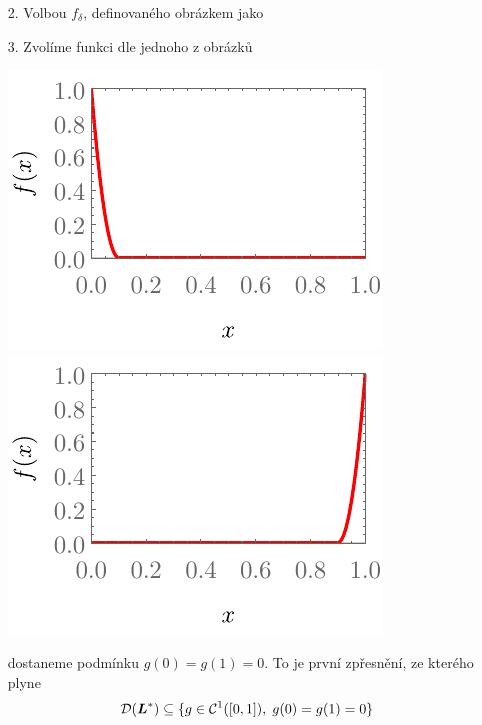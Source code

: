 {\begin{itemize}
        Při dosazení těchto $f_\epsilon$ do $(\star)$ a provedením limity $\epsilon\rightarrow0^+$ dostaneme $[f \conj{g}]_0^1=0$.
    \item[2.] Volbou $f_\delta$, definovaného obrázkem jako
    \item[3.] Zvolíme funkci dle jednoho z obrázků

            {\centering \includegraphics{img/operator_derivovani_2.pdf} \quad \includegraphics{img/operator_derivovani_3.pdf}}

        dostaneme podmínku $g(0)=g(1)=0$. To je první zpřesnění, ze kterého plyne $$\mathcal{D}(\boldsymbol{L}^*)\subseteq\{g\in\mathcal{C}^1([0,1]),\;g(0)=g(1)=0\}$$
\end{itemize}
}

\newpage

